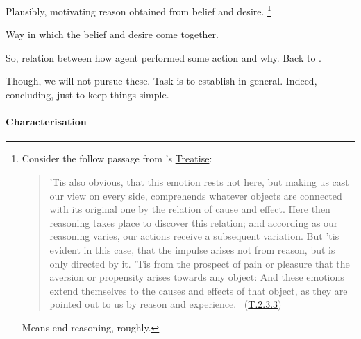 \begin{note}
  Plausibly, motivating reason obtained from belief and desire.%
  \footnote{
    Consider the follow passage from \citeauthor{Hume:2011aa}'s \hyperlink{cite.Hume:2011aa}{Treatise}:
    \begin{quote}
      ’Tis also obvious, that this emotion rests not here, but making us cast our view on every side, comprehends whatever objects are connected with its original one by the relation of cause and effect.
      Here then reasoning takes place to discover this relation; and according as our reasoning varies, our actions receive a subsequent variation.
      But ’tis evident in this case, that the impulse arises not from reason, but is only directed by it.
      ’Tis from the prospect of pain or pleasure that the aversion or propensity arises towards any object: And these emotions extend themselves to the causes and effects of that object, as they are pointed out to us by reason and experience.%
      \mbox{ }\hfill\mbox{(\hyperlink{cite.Hume:2011aa}{T.2.3.3})}
    \end{quote}
    Means end reasoning, roughly.
  }

  Way in which the belief and desire come together.

  So, relation between how agent performed some action and why.
  Back to \citeauthor{Davidson:1963aa}.

  Though, we will not pursue these.
  Task is to establish in general.
  Indeed, concluding, just to keep things simple.
\end{note}

\paragraph{Characterisation}

